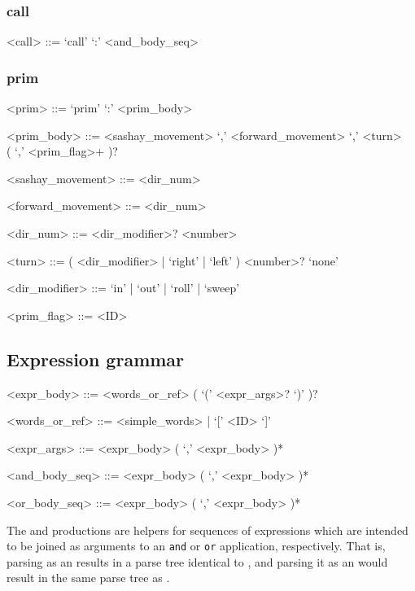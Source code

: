 \documentclass[12pt]{article}
\renewcommand{\call}[1]{\texttt{#1}} %
\begin{document}
\subsubsection{call}
\begin{grammar}
<call> ::= `call' `:' <and_body_seq>
\end{grammar}

\subsubsection{prim}
\begin{grammar}
<prim> ::= `prim' `:' <prim_body>

<prim_body> ::= <sashay_movement> `,' <forward_movement> `,' <turn> \\ ( `,' <prim_flag>+ )?

<sashay_movement> ::= <dir_num>

<forward_movement> ::= <dir_num>

<dir_num> ::= <dir_modifier>? <number>

<turn> ::= ( <dir_modifier> | `right' | `left' ) <number>?
       \alt  `none'

<dir_modifier> ::= `in' | `out' | `roll' | `sweep'

<prim_flag> ::= <ID>
\end{grammar}

\subsection{Expression grammar}
\begin{grammar}
<expr_body> ::= <words_or_ref> ( `(' <expr_args>? `)' )?

<words_or_ref> ::= <simple_words> | `[' <ID> `]'

<expr_args> ::= <expr_body> ( `,' <expr_body> )*

<and_body_seq> ::= <expr_body> ( `,' <expr_body> )*

<or_body_seq> ::= <expr_body> ( `,' <expr_body> )*
\end{grammar}

The  and  productions are
helpers for sequences of expressions which are intended to be joined
as arguments to an \call{and} or \call{or} application, respectively.
That is, parsing  as an 
results in a parse tree identical to ,
and parsing it as an  would result in the same
parse tree as .
\end{document}
